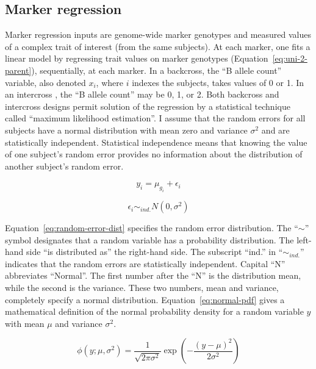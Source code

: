 \documentclass[oneside]{book}\usepackage[]{graphicx}\usepackage[]{color}
\begin{document}
\subsection{Marker regression}\label{sec:marker-regression}

Marker regression inputs are genome-wide marker genotypes and measured values of a 
complex trait of interest (from the same subjects). 
At each marker, one fits a linear model by regressing trait values on marker 
genotypes (Equation~\ref{eq:uni-2-parent}), sequentially, at each marker. In a 
backcross, the ``B allele count'' variable, also denoted $x_i$, where $i$ indexes the subjects, takes values of 0 or 1. In an intercross
, the ``B allele count'' may be 0, 1, or 2. Both backcross and intercross designs 
permit solution of the regression by a statistical technique called ``maximum likelihood estimation''. I assume that the random errors for 
all subjects have a normal distribution with mean zero and variance $\sigma^2$ and are statistically independent. Statistical 
independence means that knowing the value of one subject's random error provides no 
information about the distribution of another subject's random error.


\begin{equation}
y_i = \mu_{g_i} + \epsilon_i
\label{eq:uni-2-parent}
\end{equation}

\begin{equation}
\epsilon_i \sim_{ind.} N(0, \sigma^2)
\label{eq:random-error-dist}
\end{equation}

Equation~\ref{eq:random-error-dist} specifies the random error distribution. 
The ``$\sim$'' symbol designates that a random variable has a probability distribution. The left-hand
side ``is distributed as'' the right-hand side. The subscript ``ind.'' in ``$\sim_{ind.}$'' indicates that the random errors are statistically independent. 
Capital ``N'' abbreviates ``Normal''. The first number after 
the ``N'' is the distribution mean, while the second is the variance.
These two numbers, mean 
and variance, completely specify a normal distribution.
Equation~\ref{eq:normal-pdf} gives a mathematical definition of the normal 
probability density for a random variable $y$ with mean $\mu$ and variance $\sigma^2$. 

\begin{equation}
\phi(y; \mu, \sigma^2) = \frac{1}{\sqrt{2\pi\sigma^2}}\exp{(- \frac{(y - \mu)^2}{2\sigma^2})}
\label{eq:normal-pdf}
\end{equation}
\end{document}
